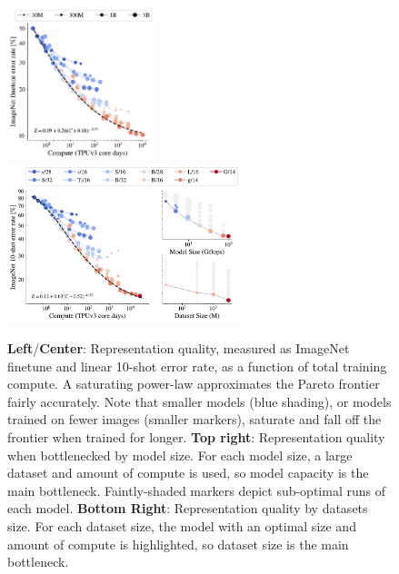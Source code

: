 \begin{figure}[t]
  \begin{center}
  \vspace{-2em}
    \includegraphics[width=0.385\textwidth]{figs/imagenet_finetune.pdf}
    \includegraphics[width=0.605\textwidth]{figs/scaling_laws_teaser_saturating2.pdf}
  \end{center}
  \vspace{-1em}
  \caption{
  \textbf{Left}/\textbf{Center}: Representation quality, measured as ImageNet finetune and linear 10-shot error rate, as a function of total training compute.
  A saturating power-law approximates the Pareto frontier fairly accurately.
  Note that smaller models (blue shading), or models trained on fewer images (smaller markers), saturate and fall off the frontier when trained for longer.
  \textbf{Top right}: Representation quality when bottlenecked by model size.
  For each model size, a large dataset and amount of compute is used, so model capacity is the main bottleneck.
  Faintly-shaded markers depict sub-optimal runs of each model.
  \textbf{Bottom Right}: Representation quality by datasets size.
  For each dataset size, the model with an optimal size and amount of compute is highlighted, so dataset size is the main bottleneck.
  }\label{fig:teaser_pic}
  \vspace{-1em}
\end{figure}

